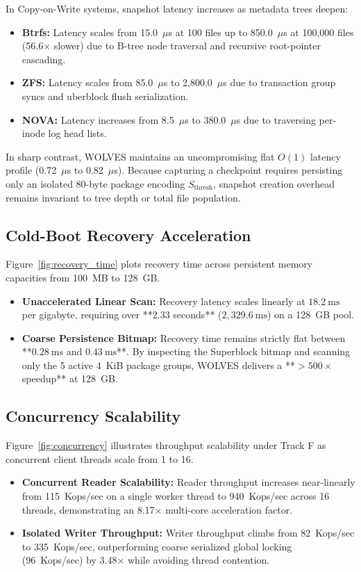\documentclass[conference]{IEEEtran}
\begin{document}
In Copy-on-Write systems, snapshot latency increases as metadata trees deepen:
\begin{itemize}
    \item \textbf{Btrfs:} Latency scales from 15.0~$\mu$s at 100 files up to 850.0~$\mu$s at 100,000 files (56.6$\times$ slower) due to B-tree node traversal and recursive root-pointer cascading.
    \item \textbf{ZFS:} Latency scales from 85.0~$\mu$s to 2,800.0~$\mu$s due to transaction group syncs and uberblock flush serialization.
    \item \textbf{NOVA:} Latency increases from 8.5~$\mu$s to 380.0~$\mu$s due to traversing per-inode log head lists.
\end{itemize}
In sharp contrast, WOLVES maintains an uncompromising flat $O(1)$ latency profile (0.72~$\mu$s to 0.82~$\mu$s). Because capturing a checkpoint requires persisting only an isolated 80-byte package encoding $S_{\text{thresh}}$, snapshot creation overhead remains invariant to tree depth or total file population.

\subsection{Cold-Boot Recovery Acceleration}
Figure~\ref{fig:recovery_time} plots recovery time across persistent memory capacities from 100~MB to 128~GB.
\begin{itemize}
    \item \textbf{Unaccelerated Linear Scan:} Recovery latency scales linearly at $18.2~\text{ms}$ per gigabyte, requiring over **2.33 seconds** ($2,329.6~\text{ms}$) on a 128~GB pool.
    \item \textbf{Coarse Persistence Bitmap:} Recovery time remains strictly flat between **$0.28~\text{ms}$ and $0.43~\text{ms}$**. By inspecting the Superblock bitmap and scanning only the 5 active 4~KiB package groups, WOLVES delivers a **$>500\times$ speedup** at 128~GB.
\end{itemize}

\subsection{Concurrency Scalability}
Figure~\ref{fig:concurrency} illustrates throughput scalability under Track F as concurrent client threads scale from 1 to 16.
\begin{itemize}
    \item \textbf{Concurrent Reader Scalability:} Reader throughput increases near-linearly from 115~Kops/sec on a single worker thread to 940~Kops/sec across 16 threads, demonstrating an 8.17$\times$ multi-core acceleration factor.
    \item \textbf{Isolated Writer Throughput:} Writer throughput climbs from 82~Kops/sec to 335~Kops/sec, outperforming coarse serialized global locking (96~Kops/sec) by 3.48$\times$ while avoiding thread contention.
\end{itemize}
\end{document}

